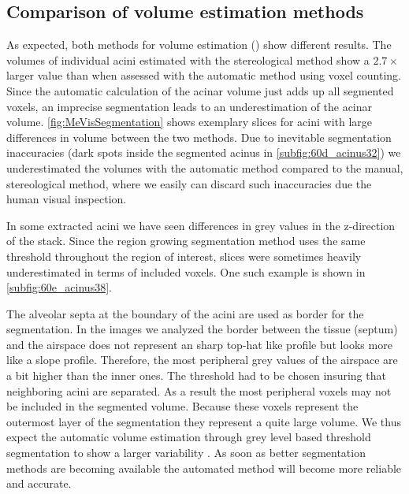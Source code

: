 \documentclass[final,paper=a4,DIV=calc,abstract,english]{scrartcl}
\newcommand{\difference}{2.7\xspace} %
\begin{document}
\subsection{Comparison of volume estimation methods}
As expected, both methods for volume estimation () show different results.
The volumes of individual acini estimated with the stereological method show a \(\difference\times\) larger value than when assessed with the automatic method using voxel counting.
Since the automatic calculation of the acinar volume just adds up all segmented voxels, an imprecise segmentation leads to an underestimation of the acinar volume.
\autoref{fig:MeVisSegmentation} shows exemplary slices for acini with large differences in volume between the two methods.
Due to inevitable segmentation inaccuracies (dark spots inside the segmented acinus in \autoref{subfig:60d_acinus32}) we underestimated the volumes with the automatic method compared to the manual, stereological method, where we easily can discard such inaccuracies due the human visual inspection.

In some extracted acini we have seen differences in grey values in the z-direction of the stack.
Since the region growing segmentation method uses the same threshold throughout the region of interest, slices were sometimes heavily underestimated in terms of included voxels. One such example is shown in \autoref{subfig:60e_acinus38}.

The alveolar septa at the boundary of the acini are used as border for the segmentation.
In the images we analyzed the border between the tissue (septum) and the airspace does not represent an sharp top-hat like profile but looks more like a slope profile.
Therefore, the most peripheral grey values of the airspace are a bit higher than the inner ones.
The threshold had to be chosen insuring that neighboring acini are separated.
As a result the most peripheral voxels may not be included in the segmented volume.
Because these voxels represent the outermost layer of the segmentation they represent a quite large volume.
We thus expect the automatic volume estimation through grey level based threshold segmentation to show a larger variability .
As soon as better segmentation methods are becoming available the automated method will become more reliable and accurate.
\end{document}
